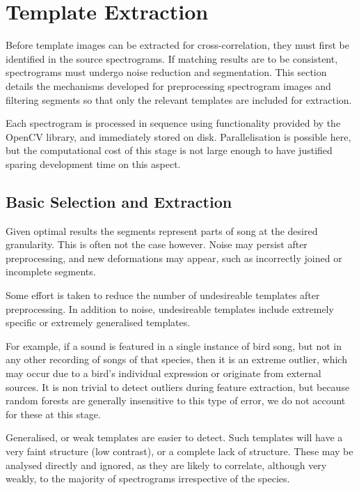 \section{Template Extraction}
Before template images can be extracted for cross-correlation, they must first be
identified in the source spectrograms.
If matching results are to be consistent, spectrograms must undergo
noise reduction and segmentation.
This section details the mechanisms developed for preprocessing spectrogram
images and filtering segments so that only the relevant templates are included for
extraction.

Each spectrogram is processed in sequence using functionality provided by the
OpenCV \parencite{opencv_library} library, and immediately stored on disk.
Parallelisation is possible here, but the computational cost of this stage is
not large enough to have justified sparing development time on this aspect.



\subsection{Basic Selection and Extraction}\label{sec:template_select}
Given optimal results the segments represent parts of song at the desired
granularity.
This is often not the case however.
Noise may persist after preprocessing, and new deformations may appear, such as
incorrectly joined or incomplete segments.

Some effort is taken to reduce the number of undesireable templates after
preprocessing.
In addition to noise, undesireable templates include extremely specific or
extremely generalised templates.

For example, if a sound is featured in a single instance of bird song, but not
in any other recording of songs of that species, then it is an extreme outlier,
which may occur due to a bird's individual expression or originate from external
sources.
It is non trivial to detect outliers during feature extraction, but because
random forests are generally insensitive to this type of error, we do not
account for these at this stage.

Generalised, or weak templates are easier to detect.
Such templates will have a very faint structure (low contrast), or a complete
lack of structure.
These may be analysed directly and ignored, as they are likely to correlate,
although very weakly, to the majority of spectrograms irrespective of the
species.

